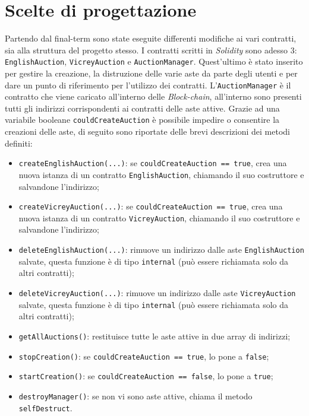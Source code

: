 \section{Scelte di progettazione}
Partendo dal final-term sono state eseguite differenti modifiche ai vari contratti, sia alla struttura del progetto stesso. I contratti scritti in \textit{Solidity} sono adesso 3: \texttt{EnglishAuction}, \texttt{VicreyAuction} e \texttt{AuctionManager}. Quest'ultimo è stato inserito per gestire la creazione, la distruzione delle varie aste da parte degli utenti e per dare un punto di riferimento per l'utilizzo dei contratti.\newline
L'\texttt{AuctionManager} è il contratto che viene caricato all'interno delle \textit{Block-chain}, all'interno sono presenti tutti gli indirizzi corrispondenti ai contratti delle aste attive. Grazie ad una variabile booleane \texttt{couldCreateAuction} è possibile impedire o consentire la creazioni delle aste, di seguito sono riportate delle brevi descrizioni dei metodi definiti:
\begin{itemize}
	\item \texttt{createEnglishAuction(...)}: se \texttt{couldCreateAuction == true}, crea una nuova istanza di un contratto \texttt{EnglishAuction}, chiamando il suo costruttore e salvandone l'indirizzo;
	\item \texttt{createVicreyAuction(...)}: se \texttt{couldCreateAuction == true}, crea una nuova istanza di un contratto \texttt{VicreyAuction}, chiamando il suo costruttore e salvandone l'indirizzo;
	\item \texttt{deleteEnglishAuction(...)}: rimuove un indirizzo dalle aste \texttt{EnglishAuction} salvate, questa funzione è di tipo \texttt{internal} (può essere richiamata solo da altri contratti);
	\item \texttt{deleteVicreyAuction(...)}: rimuove un indirizzo dalle aste \texttt{VicreyAuction} salvate,  questa funzione è di tipo \texttt{internal} (può essere richiamata solo da altri contratti);
	\item \texttt{getAllAuctions()}: restituisce tutte le aste attive in due array di indirizzi;
	\item \texttt{stopCreation()}: se \texttt{couldCreateAuction == true}, lo pone a \texttt{false};
	\item \texttt{startCreation()}: se \texttt{couldCreateAuction == false}, lo pone a \texttt{true};
	\item \texttt{destroyManager()}: se non vi sono aste attive, chiama il metodo \texttt{selfDestruct}.
\end{itemize}
